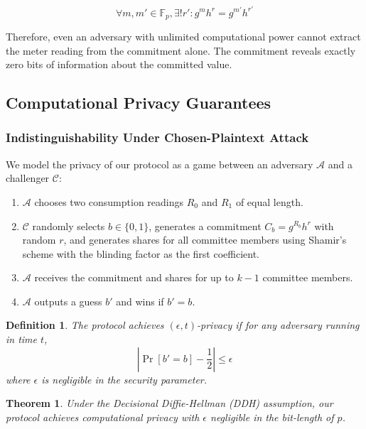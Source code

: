 \documentclass[conference]{IEEEtran}
\newtheorem{theorem}{Theorem}
\newtheorem{definition}{Definition}
\begin{document}
\begin{equation}
\forall m, m' \in \mathbb{F}_p, \exists! r' : g^{m} h^{r} = g^{m'} h^{r'}
\end{equation}

Therefore, even an adversary with unlimited computational power cannot extract the meter reading from the commitment alone. The commitment reveals exactly zero bits of information about the committed value.

\subsection{Computational Privacy Guarantees}

\subsubsection{Indistinguishability Under Chosen-Plaintext Attack}

We model the privacy of our protocol as a game between an adversary \(\mathcal{A}\) and a challenger \(\mathcal{C}\):

\begin{enumerate}
\item \(\mathcal{A}\) chooses two consumption readings \(R_0\) and \(R_1\) of equal length.
\item \(\mathcal{C}\) randomly selects \(b \in \{0,1\}\), generates a commitment \(C_b = g^{R_b} h^r\) with random \(r\), and generates shares for all committee members using Shamir's scheme with the blinding factor as the first coefficient.
\item \(\mathcal{A}\) receives the commitment and shares for up to \(k-1\) committee members.
\item \(\mathcal{A}\) outputs a guess \(b'\) and wins if \(b' = b\).
\end{enumerate}

\begin{definition}
The protocol achieves \((\epsilon, t)\)-privacy if for any adversary running in time \(t\),
\begin{equation}
|\Pr[b' = b] - \frac{1}{2}| \leq \epsilon
\end{equation}
where \(\epsilon\) is negligible in the security parameter.
\end{definition}

\begin{theorem}
Under the Decisional Diffie-Hellman (DDH) assumption, our protocol achieves computational privacy with \(\epsilon\) negligible in the bit-length of \(p\).
\end{theorem}
\end{document}
